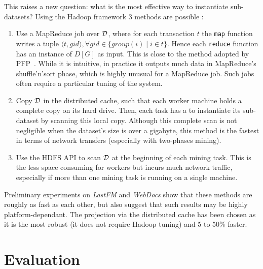 This raises a new question: what is the most effective way to instantiate sub-datasets?
Using the Hadoop framework 3 methods are possible :
\begin{enumerate}
	\item Use a MapReduce job over ${\cal D}$, where for each transaction $t$ the
	\verb|map| function writes a tuple
	$\langle t, gid\rangle, \forall gid \in \{\mathit{group}(i) \mid i \in t\}$.
	Hence each \verb|reduce| function has an instance of $D[G]$ as input.
	This is close to the method adopted by PFP~\cite{LiRecSys08}.
	While it is intuitive, in practice it outputs much data in MapReduce's shuffle'n'sort phase,
	which is highly unusual for a MapReduce job.
 	Such jobs often require a particular tuning of the system.

	\item
	Copy ${\cal D}$ in the distributed cache, such that each worker machine holds a complete copy on its hard drive.
	Then, each task has a to instantiate its sub-dataset by scanning this local copy.
	Although this complete scan is not negligible when the dataset's size is over a gigabyte,
	this method is the fastest in terms of network transfers
	(especially with two-phases mining).

	\item Use the HDFS API to scan ${\cal D}$ at the beginning of each mining task.
	This is the less space consuming for workers but incurs much network traffic,
	especially if more than one mining task is running on a single machine.
\end{enumerate}

Preliminary experiments on {\em LastFM} and {\em WebDocs} show that these methods
are roughly as fast as each other,
but also suggest that such results may be highly platform-dependant.
The projection via the distributed cache has been chosen as it is the most robust
(it does not require Hadoop tuning) and 5 to 50\% faster.




















\section{Evaluation}
\label{sec:toppi:xp}

